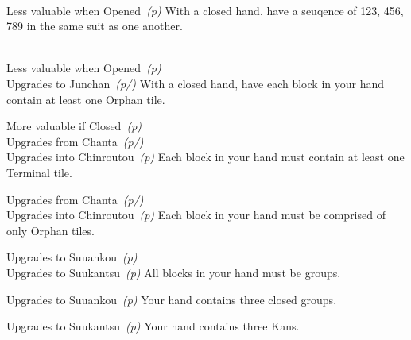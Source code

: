 	{\closedhand \\
	\lessvaluable Less valuable when Opened~\textit{(p\pageref{core:yaku:Ittsuu})}}
	{With a closed hand, have a seuqence of 123, 456, 789 in the same suit as one another.}

	{\closedhand \\ 
	\lessvaluable Less valuable when Opened~\textit{(p\pageref{core:yaku:Chanta})} \\
	\upgradesto Upgrades to Junchan~\textit{(p\pageref{core:yaku:Junchan}/\pageref{core:yaku:Menzen Junchan})}}
	{With a closed hand, have each block in your hand contain at least one Orphan tile.}

	{\morevaluable More valuable if Closed~\textit{(p\pageref{core:yaku:Menzen Junchan})} \\ 
	\upgradesfrom Upgrades from Chanta~\textit{(p\pageref{core:yaku:Chanta}/\pageref{core:yaku:Menzen Chanta})} \\
	\upgradesto Upgrades into Chinroutou~\textit{(p\pageref{core:yaku:Chinroutou})}}
	{Each block in your hand must contain at least one Terminal tile.}

	{\upgradesfrom Upgrades from Chanta~\textit{(p\pageref{core:yaku:Chanta}/\pageref{core:yaku:Menzen Chanta})} \\
	\upgradesto Upgrades into Chinroutou~\textit{(p\pageref{core:yaku:Chinroutou})}}
	{Each block in your hand must be comprised of only Orphan tiles.}

	{\upgradesto Upgrades to Suuankou~\textit{(p\pageref{core:yaku:Suuankou})}\\
	\upgradesto Upgrades to Suukantsu~\textit{(p\pageref{core:yaku:Suukantsu})}}
	{All blocks in your hand must be groups.}

	{\upgradesto Upgrades to Suuankou~\textit{(p\pageref{core:yaku:Suuankou})}}
	{Your hand contains three closed groups.}

	{\upgradesto Upgrades to Suukantsu~\textit{(p\pageref{core:yaku:Suukantsu})}}
	{Your hand contains three Kans.}

